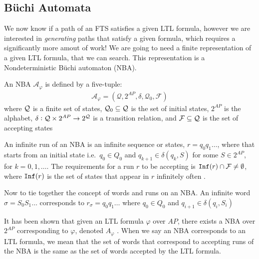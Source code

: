 \subsection{B\"{u}chi Automata}
We now know if a path of an FTS satisfies a given LTL formula, however we are interested in \textit{generating} paths that satisfy a given formula, which requires a significantly more amout of work! We are going to need a finite representation of a given LTL formula, that we can search. This representation is a Nondeterministic B\"{u}chi automaton (NBA). 
\begin{definition}
\label{defNBA}
An NBA $\mathcal{A}_\varphi$ is defined by a five-tuple:
\begin{align*}
\mathcal{A}_\varphi = (\mathcal{Q},2^{AP},\delta,\mathcal{Q}_0,\mathcal{F})
\end{align*}
where $\mathcal{Q}$ is a finite set of states, $\mathcal{Q}_0 \subseteq \mathcal{Q}$ is the set of initial states, $2^{AP}$ is the alphabet, $\delta: \mathcal{Q} \times 2^{AP} \rightarrow 2^{\mathcal{Q}}$ is a transition relation, and $\mathcal{F} \subseteq \mathcal{Q}$ is the set of accepting states
\end{definition} 
An infinite run of an NBA is an infinite sequence or states, $r=q_0 q_1 \dots$, where that starts from an initial state i.e.\ $q_0 \in Q_0$ and $q_{k+1} \in \delta(q_k, S)$ for some $S \in 2^{AP}$, for $k = 0,1,\dots$. The requirements for a run $r$ to be accepting is $\texttt{Inf}(r) \cap \mathcal{F} \neq \emptyset$, where $\texttt{Inf}(r)$ is the set of states that appear in $r$ infinitely often \cite{guo15}. 

Now to tie together the concept of words and runs on an NBA. An infinite word $\sigma = S_0 S_1 \dots$ corresponds to $r_\sigma = q_0 q_1 \dots$ where $q_0 \in Q_0$ and $q_{i+1} \in \delta(q_i,S_i)$

It has been shown that given an LTL formula $\varphi$ over $AP$, there exists a NBA over $2^{AP}$ corresponding to $\varphi$, denoted $A_\varphi$ \cite{baier08}. When we say an NBA corresponds to an LTL formula, we mean that the set of words that correspond to accepting runs of the NBA is the same as the set of words accepted by the LTL formula.  


